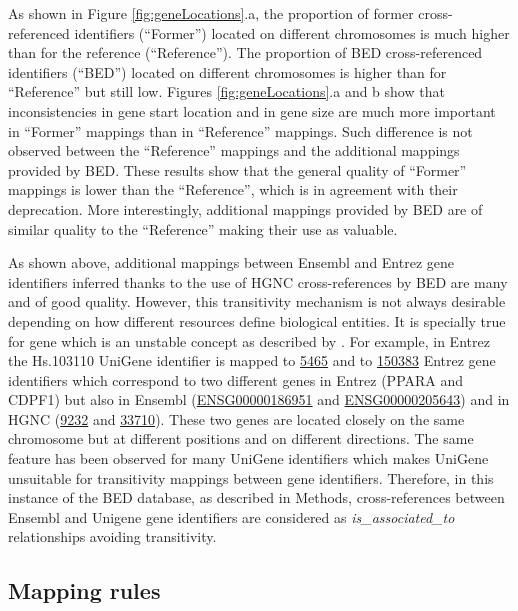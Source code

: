 \documentclass[9pt,a4paper,]{extarticle}
\theoremstyle{definition}
\theoremstyle{definition}
\theoremstyle{definition}
\theoremstyle{remark}
\begin{document}
As shown in Figure \ref{fig:geneLocations}.a,
the proportion of former cross-referenced identifiers (``Former'')
located on different
chromosomes is much higher than for the reference (``Reference'').
The proportion of BED cross-referenced identifiers (``BED'') located on different
chromosomes is higher than for ``Reference'' but still low.
Figures \ref{fig:geneLocations}.a and b show that inconsistencies
in gene start location and in gene size are much more
important in ``Former'' mappings than in ``Reference'' mappings.
Such difference is not observed between the ``Reference'' mappings and the
additional mappings provided by BED.
These results show that the general quality of ``Former'' mappings is lower
than the ``Reference'', which is in agreement with their deprecation.
More interestingly, additional mappings provided by BED
are of similar quality to the ``Reference'' making their use as valuable.

As shown above, additional mappings between Ensembl and Entrez gene identifiers
inferred thanks to the use of HGNC cross-references by BED are many and of good
quality. However, this transitivity mechanism is not always desirable
depending on how different resources define biological entities.
It is specially true for gene which is an unstable concept as described
by \citet{gerstein_what_2007}.
For example, in Entrez the Hs.103110 UniGene identifier is mapped
to \href{https://www.ncbi.nlm.nih.gov/gene/5465}{5465} and
to \href{https://www.ncbi.nlm.nih.gov/gene/150383}{150383}
Entrez gene identifiers which correspond to two different genes
in Entrez (PPARA and CDPF1) but also in
Ensembl (\href{http://www.ensembl.org/id/ENSG00000186951}{ENSG00000186951}
and \href{http://www.ensembl.org/id/ENSG00000205643}{ENSG00000205643})
and in HGNC (\href{http://www.genenames.org/cgi-bin/gene_symbol_report?hgnc_id=9232}{9232}
and \href{http://www.genenames.org/cgi-bin/gene_symbol_report?hgnc_id=33710}{33710}).
These two genes are located closely on the same chromosome but
at different positions and on different directions.
The same feature has been observed for many UniGene identifiers which makes
UniGene unsuitable for transitivity mappings between gene identifiers.
Therefore, in this instance of the BED database, as described in Methods,
cross-references between Ensembl and Unigene gene identifiers are considered
as \emph{is\_associated\_to} relationships avoiding transitivity.

\subsection{Mapping rules}\label{mapping-rules}
\end{document}
